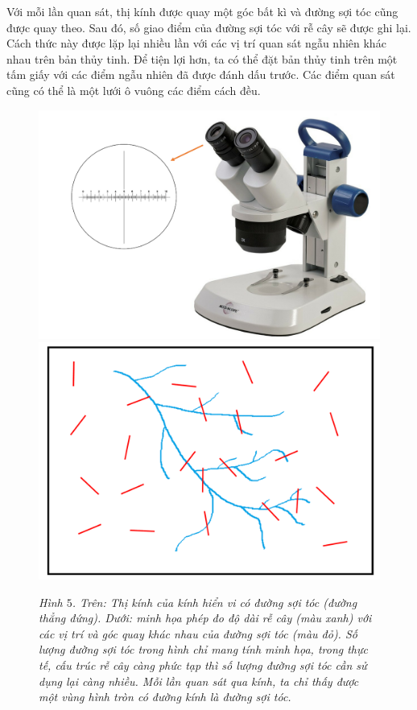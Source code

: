 \begin{multicols}{2}
	\vskip 0.1cm
	Với mỗi lần quan sát, thị kính được quay một góc bất kì và đường sợi tóc cũng được quay theo. Sau đó, số giao điểm của đường sợi tóc với rễ cây sẽ được ghi lại. Cách thức này được lặp lại nhiều lần với các vị trí quan sát ngẫu nhiên khác nhau trên bản thủy tinh. Để tiện lợi hơn, ta có thể đặt bản thủy tinh trên một tấm giấy với các điểm ngẫu nhiên đã được đánh dấu trước. Các điểm quan sát cũng có thể là một lưới ô vuông các điểm cách đều.
	\begin{figure}[H]
		\centering
		\captionsetup{labelformat= empty, justification=centering}
		\includegraphics[width=1\linewidth]{7}
		\includegraphics[width=1\linewidth]{8}
		\caption{\small\textit{\color{toanhocdoisong}Hình $5$. Trên: Thị kính của kính hiển vi có đường sợi tóc (đường thẳng đứng). Dưới: minh họa phép đo độ dài rễ cây (màu xanh) với các vị trí và góc quay khác nhau của đường sợi tóc (màu đỏ). Số lượng đường sợi tóc trong hình chỉ mang tính minh họa, trong thực tế, cấu trúc rễ cây càng phức tạp thì số lượng đường sợi tóc cần sử dụng lại càng nhiều. Mỗi lần quan sát qua kính, ta chỉ thấy được một vùng hình tròn có đường kính là đường sợi tóc.}}

\end{figure}
\end{multicols}

